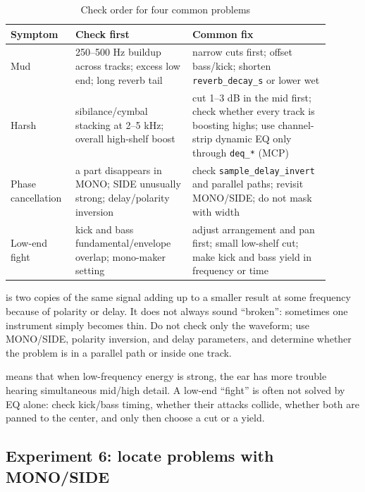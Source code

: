 \begin{table}[htbp]
\centering
\small
\begin{tabular}{@{}p{0.16\linewidth}p{0.34\linewidth}p{0.40\linewidth}@{}}
\hline
Symptom & Check first & Common fix \\
\hline
Mud & 250--500 Hz buildup across tracks; excess low end; long reverb tail & narrow cuts first; offset bass/kick; shorten \texttt{reverb\_decay\_s} or lower wet \\
Harsh & sibilance/cymbal stacking at 2--5 kHz; overall high-shelf boost & cut 1--3 dB in the mid first; check whether every track is boosting highs; use channel-strip dynamic EQ only through \texttt{deq\_*} (MCP) \\
Phase cancellation & a part disappears in MONO; SIDE unusually strong; delay/polarity inversion & check \texttt{sample\_delay\_invert} and parallel paths; revisit MONO/SIDE; do not mask with width \\
Low-end fight & kick and bass fundamental/envelope overlap; mono-maker setting & adjust arrangement and pan first; small low-shelf cut; make kick and bass yield in frequency or time \\
\hline
\end{tabular}
\caption{Check order for four common problems}
\label{tab:advanced-troubleshooting}
\end{table}

 is two copies of the same signal adding up to a smaller result at some frequency because of polarity or delay. It does not always sound ``broken'': sometimes one instrument simply becomes thin. Do not check only the waveform; use MONO/SIDE, polarity inversion, and delay parameters, and determine whether the problem is in a parallel path or inside one track.

 means that when low-frequency energy is strong, the ear has more trouble hearing simultaneous mid/high detail. A low-end ``fight'' is often not solved by EQ alone: check kick/bass timing, whether their attacks collide, whether both are panned to the center, and only then choose a cut or a yield.

\subsection{Experiment 6: locate problems with MONO/SIDE}

